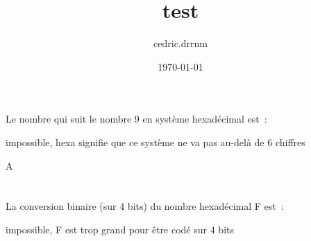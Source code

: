 \documentclass[answers]{exam}
\title{test}
\author{cedric.drrnm }
\date{\today}
\begin{document}
\maketitle

\begin{minipage}{\linewidth}

\part{}
Le nombre qui suit le nombre 9 en système hexadécimal est~:
\bigskip

\begin{checkboxes}


\choice impossible, hexa signifie que ce système ne va pas au-delà de 6 chiffres


\CorrectChoice A

\end{checkboxes}

\end{minipage}

\bigskip


\begin{minipage}{\linewidth}

\part{}

La conversion binaire (sur 4 bits) du nombre hexadécimal F est~:

\bigskip


\begin{checkboxes}


\choice impossible, F est trop grand pour être codé sur 4 bits



\end{checkboxes}

\end{minipage}
\end{document}

